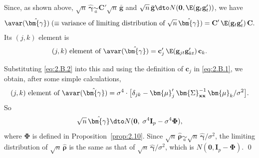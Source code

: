 Since, as shown above,
$\sqrt{n}\,\hat{\bm{\gamma}} \underset{a}{\sim} \mathbf{C}'\sqrt{n}\,\bar{\mathbf{g}}$
and $\sqrt{n}\,\bar{\mathbf{g}} \dto N(\mathbf{0}, \E(\mathbf{g}_t\mathbf{g}_t'))$, we have
\[
\avar(\hat{\bm{\gamma}})
\;(\equiv \text{variance of limiting distribution of }
\sqrt{n}\,\hat{\bm{\gamma}})
= \mathbf{C}'\,\E(\mathbf{g}_t\mathbf{g}_t')\,\mathbf{C}.
\]
Its $(j, k)$ element is
\[
(j, k) \text{ element of } \avar(\hat{\bm{\gamma}})
= \mathbf{c}_j'\,\E(\mathbf{g}_{jt}\mathbf{g}_{kt}')\,\mathbf{c}_k.
\]

Substituting \eqref{eq:2.B.2} into this and using the definition of $\mathbf{c}_j$ in \eqref{eq:2.B.1}, we obtain,
after some simple calculations,
\[
(j, k) \text{ element of } \avar(\hat{\bm{\gamma}})
= \sigma^4 \cdot \bigl[\delta_{jk}
- \bm{\mu}_j'\,\bm{\Sigma}_{\mathbf{xx}}^{-1}\,\bm{\mu}_k/\sigma^2\bigr].
\]
So
\[
\sqrt{n}\,\hat{\bm{\gamma}} \dto
N(\mathbf{0},\;\sigma^4\mathbf{I}_p - \sigma^4\mathbf{\Phi}),
\]
where $\mathbf{\Phi}$ is defined in Proposition~\ref{prop:2.10}. Since
$\sqrt{n}\,\hat{\bm{\rho}} \underset{a}{\sim} \sqrt{n}\,\hat{\bm{\gamma}}/\sigma^2$,
the limiting distribution of $\sqrt{n}\,\hat{\bm{\rho}}$ is the same as that of
$\sqrt{n}\,\hat{\bm{\gamma}}/\sigma^2$, which is
$N(\mathbf{0}, \mathbf{I}_p - \mathbf{\Phi})$. \qed
